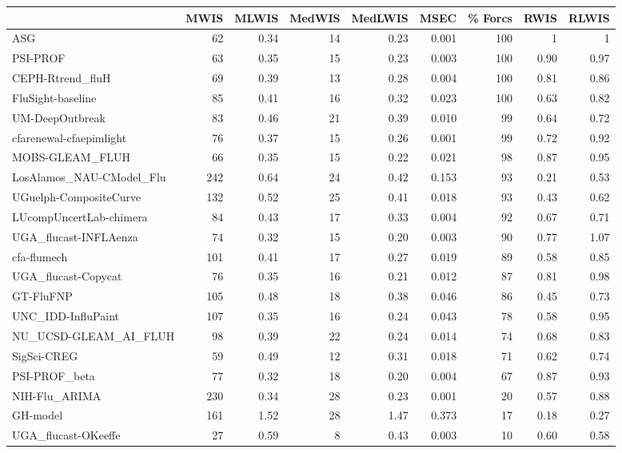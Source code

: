 \begin{table}[ht]
\centering
\begin{adjustwidth}{-3cm}{-1.5cm}
\begin{tabular}{lrrrrrrrr}
 & MWIS & MLWIS & MedWIS & MedLWIS & MSEC & \% Forcs & RWIS & RLWIS\\ 
  \hline
ASG & 62 & 0.34 & 14 & 0.23 & 0.001 & 100 & 1 & 1 \\ 
  PSI-PROF & 63 & 0.35 & 15 & 0.23 & 0.003 & 100 & 0.90 & 0.97 \\ 
  CEPH-Rtrend\_fluH & 69 & 0.39 & 13 & 0.28 & 0.004 & 100 & 0.81 & 0.86 \\ 
  FluSight-baseline & 85 & 0.41 & 16 & 0.32 & 0.023 & 100 & 0.63 & 0.82 \\ 
  UM-DeepOutbreak & 83 & 0.46 & 21 & 0.39 & 0.010 & 99 & 0.64 & 0.72 \\ 
  cfarenewal-cfaepimlight & 76 & 0.37 & 15 & 0.26 & 0.001 & 99 & 0.72 & 0.92 \\ 
  MOBS-GLEAM\_FLUH & 66 & 0.35 & 15 & 0.22 & 0.021 & 98 & 0.87 & 0.95 \\ 
  LosAlamos\_NAU-CModel\_Flu & 242 & 0.64 & 24 & 0.42 & 0.153 & 93 & 0.21 & 0.53 \\ 
  UGuelph-CompositeCurve & 132 & 0.52 & 25 & 0.41 & 0.018 & 93 & 0.43 & 0.62 \\ 
  LUcompUncertLab-chimera & 84 & 0.43 & 17 & 0.33 & 0.004 & 92 & 0.67 & 0.71 \\ 
  UGA\_flucast-INFLAenza & 74 & 0.32 & 15 & 0.20 & 0.003 & 90 & 0.77 & 1.07 \\ 
  cfa-flumech & 101 & 0.41 & 17 & 0.27 & 0.019 & 89 & 0.58 & 0.85 \\ 
  UGA\_flucast-Copycat & 76 & 0.35 & 16 & 0.21 & 0.012 & 87 & 0.81 & 0.98 \\ 
  GT-FluFNP & 105 & 0.48 & 18 & 0.38 & 0.046 & 86 & 0.45 & 0.73 \\ 
  UNC\_IDD-InfluPaint & 107 & 0.35 & 16 & 0.24 & 0.043 & 78 & 0.58 & 0.95 \\ 
  NU\_UCSD-GLEAM\_AI\_FLUH & 98 & 0.39 & 22 & 0.24 & 0.014 & 74 & 0.68 & 0.83 \\ 
  SigSci-CREG & 59 & 0.49 & 12 & 0.31 & 0.018 & 71 & 0.62 & 0.74 \\ 
  PSI-PROF\_beta & 77 & 0.32 & 18 & 0.20 & 0.004 & 67 & 0.87 & 0.93 \\ 
  NIH-Flu\_ARIMA & 230 & 0.34 & 28 & 0.23 & 0.001 & 20 & 0.57 & 0.88 \\ 
  GH-model & 161 & 1.52 & 28 & 1.47 & 0.373 & 17 & 0.18 & 0.27 \\ 
  UGA\_flucast-OKeeffe & 27 & 0.59 & 8 & 0.43 & 0.003 & 10 & 0.60 & 0.58 \\  
\end{tabular}
\end{adjustwidth}
\end{table}

